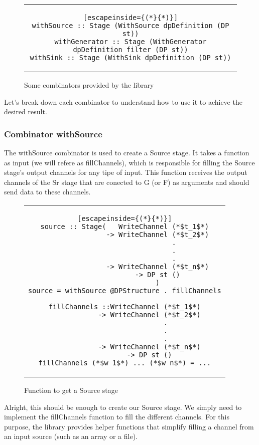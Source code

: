 \begin{figure}[H]
    \centering
    \begin{tabular}{c}
        \begin{lstlisting}[escapeinside={(*}{*)}]
withSource :: Stage (WithSource dpDefinition (DP st))
withGenerator :: Stage (WithGenerator dpDefinition filter (DP st))
withSink :: Stage (WithSink dpDefinition (DP st))
        \end{lstlisting}
    \end{tabular}
    \caption{Some combinators provided by the library}
    \label{fig:HC2}
\end{figure}
Let's break down each combinator to understand how to use it to achieve the desired result.

\subsubsection*{Combinator withSource}

The withSource combinator is used to create a Source stage.
It takes a function as input (we will refere as fillChannels), which is responsible for filling the Source stage's output channels for any tipe of input.
This function receives the output channels of the Sr stage that are conected to G (or F) as arguments and should send data to these channels.

\begin{figure}[H]
    \begin{tabular}{c}
        \begin{lstlisting}[escapeinside={(*}{*)}]
source :: Stage(   WriteChannel (*$t_1$*)
                -> WriteChannel (*$t_2$*)
                        .
                        .
                        .
                -> WriteChannel (*$t_n$*)
                -> DP st ()
                )
source = withSource @DPStructure . fillChannels

fillChannels ::WriteChannel (*$t_1$*)
            -> WriteChannel (*$t_2$*)
                    .
                    .
                    .
            -> WriteChannel (*$t_n$*)
            -> DP st ()
fillChannels (*$w_1$*) ... (*$w_n$*) = ...
        \end{lstlisting}
    \end{tabular}
    \caption{Function to get a Source stage}
    \label{fig:HC3}
\end{figure}

Alright, this should be enough to create our Source stage.
We simply need to implement the fillChannels function to fill the different channels.
For this purpose, the library provides helper functions that simplify filling a channel from an input source (such as an array or a file).


